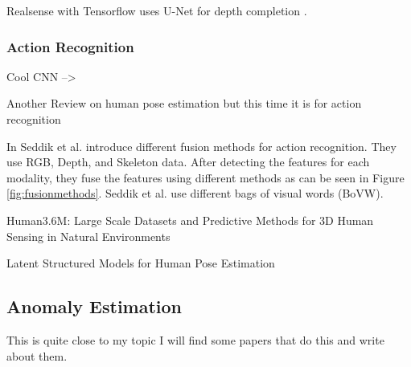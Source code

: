 Realsense with Tensorflow \cite{TensorflowRealsense} uses U-Net for depth completion \cite{UNET}.

\subsubsection{Action Recognition}

Cool CNN --> \cite{ElboushakiAbdessamad2020MAmf}

Another Review on human pose estimation but this time it is for action recognition \cite{ReviewHPEforActionRecognition}

In \cite{Seddik2017} Seddik et al. introduce different fusion methods for action recognition. They use RGB, Depth, and Skeleton data. After detecting the features for each modality, they fuse the features using different methods as can be seen in Figure \ref{fig:fusionmethods}. Seddik et al. use different bags of visual words (BoVW).

Human3.6M: Large Scale Datasets and Predictive Methods for 3D Human Sensing in Natural Environments \cite{h36m_pami}

Latent Structured Models for Human Pose Estimation \cite{IonescuSminchisescu11} 

\subsection{Anomaly Estimation}

This is quite close to my topic I will find some papers that do this and write about them.